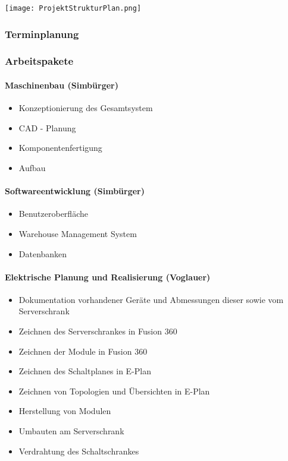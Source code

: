 \bgroup
    \centering
    \texttt{[image: ProjektStrukturPlan.png]}
\egroup

\newpage
\subsubsection{Terminplanung}

\newpage

\subsubsection{Arbeitspakete}

\paragraph{Maschinenbau (Simbürger)}
\begin{itemize}
    \item Konzeptionierung des Gesamtsystem
    \item CAD - Planung
    \item Komponentenfertigung
    \item Aufbau 
\end{itemize}

\paragraph{Softwareentwicklung (Simbürger)}
\begin{itemize}
    \item Benutzeroberfläche
    \item Warehouse Management System
    \item Datenbanken
\end{itemize}

\paragraph{Elektrische Planung und Realisierung (Voglauer)}
\begin{itemize}
    \item Dokumentation vorhandener Geräte und Abmessungen dieser sowie vom Serverschrank 
    \item Zeichnen des Serverschrankes in Fusion 360
    \item Zeichnen der Module in Fusion 360
    \item Zeichnen des Schaltplanes in E-Plan 
    \item Zeichnen von Topologien und Übersichten in E-Plan 
    \item Herstellung von Modulen 
    \item Umbauten am Serverschrank
    \item Verdrahtung des Schaltschrankes
\end{itemize}





